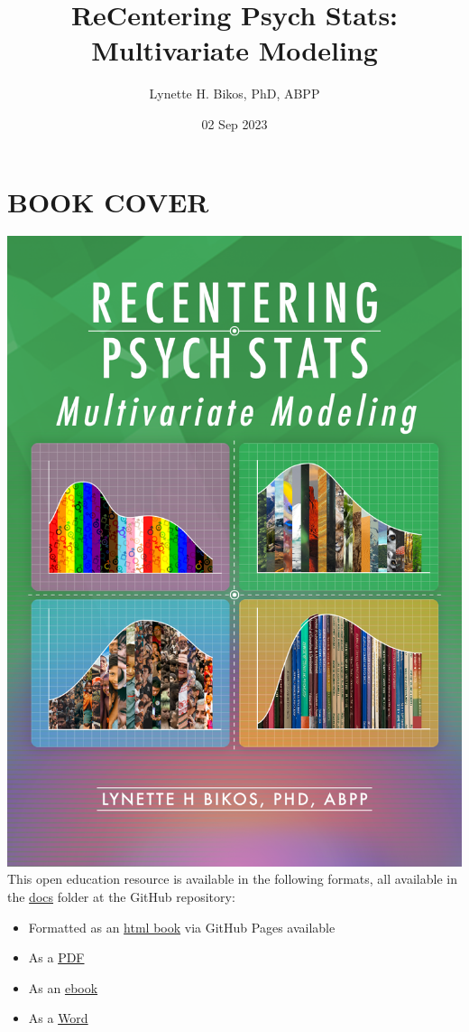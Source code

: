 \documentclass[
  11pt,
]{book}
\title{ReCentering Psych Stats: Multivariate Modeling}
\author{Lynette H. Bikos, PhD, ABPP}
\date{02 Sep 2023}
\providecommand{\tightlist}{%
  \setlength{\itemsep}{0pt}\setlength{\parskip}{0pt}}
\begin{document}
\maketitle

{
\hypersetup{linkcolor=}
\setcounter{tocdepth}{3}
\tableofcontents
}
\hypertarget{book-cover}{%
\chapter*{BOOK COVER}\label{book-cover}}


\includegraphics{images/ReC_multivariate_bkcvr.png} This open education resource is available in the following formats, all available in the \href{https://github.com/lhbikos/ReC_MultivModel/tree/main/docs}{docs} folder at the GitHub repository:

\begin{itemize}
\tightlist
\item
  Formatted as an \href{https://lhbikos.github.io/ReC_MultivModel/}{html book} via GitHub Pages available
\item
  As a \href{https://github.com/lhbikos/ReC_MultivModel/blob/main/docs/ReC_MultMod.pdf}{PDF}
\item
  As an \href{https://github.com/lhbikos/ReC_MultivModel/blob/main/docs/ReC_MultMod.epub}{ebook}
\item
  As a \href{https://github.com/lhbikos/ReC_MultivModel/blob/main/docs/ReC_MultMod.docx}{Word}
\end{itemize}
\end{document}
